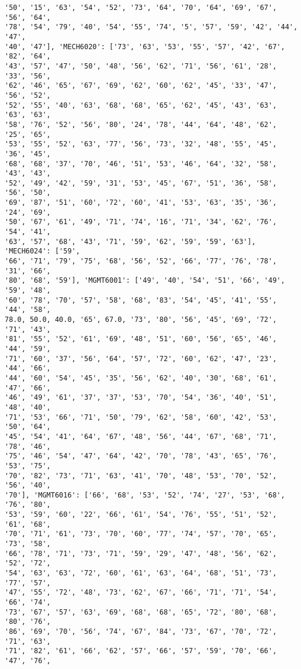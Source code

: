\documentclass[11pt]{article}
\begin{document}
\begin{Verbatim}[commandchars=\\\{\}]
'50', '15', '63', '54', '52', '73', '64', '70', '64', '69', '67', '56', '64',
'78', '54', '79', '40', '54', '55', '74', '5', '57', '59', '42', '44', '47',
'40', '47'], 'MECH6020': ['73', '63', '53', '55', '57', '42', '67', '82', '64',
'43', '57', '47', '50', '48', '56', '62', '71', '56', '61', '28', '33', '56',
'62', '46', '65', '67', '69', '62', '60', '62', '45', '33', '47', '56', '52',
'52', '55', '40', '63', '68', '68', '65', '62', '45', '43', '63', '63', '63',
'58', '76', '52', '56', '80', '24', '78', '44', '64', '48', '62', '25', '65',
'53', '55', '52', '63', '77', '56', '73', '32', '48', '55', '45', '36', '45',
'68', '68', '37', '70', '46', '51', '53', '46', '64', '32', '58', '43', '43',
'52', '49', '42', '59', '31', '53', '45', '67', '51', '36', '58', '56', '50',
'69', '87', '51', '60', '72', '60', '41', '53', '63', '35', '36', '24', '69',
'50', '67', '61', '49', '71', '74', '16', '71', '34', '62', '76', '54', '41',
'63', '57', '68', '43', '71', '59', '62', '59', '59', '63'], 'MECH6024': ['59',
'66', '71', '79', '75', '68', '56', '52', '66', '77', '76', '78', '31', '66',
'80', '68', '59'], 'MGMT6001': ['49', '40', '54', '51', '66', '49', '59', '48',
'60', '78', '70', '57', '58', '68', '83', '54', '45', '41', '55', '44', '58',
78.0, 50.0, 40.0, '65', 67.0, '73', '80', '56', '45', '69', '72', '71', '43',
'81', '55', '52', '61', '69', '48', '51', '60', '56', '65', '46', '44', '59',
'71', '60', '37', '56', '64', '57', '72', '60', '62', '47', '23', '44', '66',
'44', '60', '54', '45', '35', '56', '62', '40', '30', '68', '61', '47', '66',
'46', '49', '61', '37', '37', '53', '70', '54', '36', '40', '51', '48', '40',
'71', '53', '66', '71', '50', '79', '62', '58', '60', '42', '53', '50', '64',
'45', '54', '41', '64', '67', '48', '56', '44', '67', '68', '71', '78', '46',
'75', '46', '54', '47', '64', '42', '70', '78', '43', '65', '76', '53', '75',
'70', '82', '73', '71', '63', '41', '70', '48', '53', '70', '52', '56', '40',
'70'], 'MGMT6016': ['66', '68', '53', '52', '74', '27', '53', '68', '76', '80',
'53', '59', '60', '22', '66', '61', '54', '76', '55', '51', '52', '61', '68',
'70', '71', '61', '73', '70', '60', '77', '74', '57', '70', '65', '73', '58',
'66', '78', '71', '73', '71', '59', '29', '47', '48', '56', '62', '52', '72',
'54', '63', '63', '72', '60', '61', '63', '64', '68', '51', '73', '77', '57',
'47', '55', '72', '48', '73', '62', '67', '66', '71', '71', '54', '66', '74',
'73', '67', '57', '63', '69', '68', '68', '65', '72', '80', '68', '80', '76',
'86', '69', '70', '56', '74', '67', '84', '73', '67', '70', '72', '71', '63',
'71', '82', '61', '66', '62', '57', '66', '57', '59', '70', '66', '47', '76',

\end{Verbatim}
\end{document}
